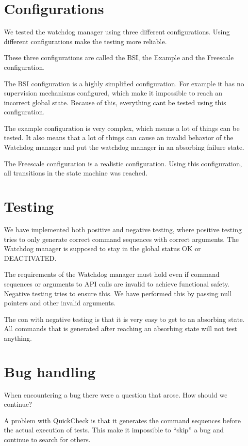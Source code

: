 \documentclass[a4paper]{article}
\begin{document}
\section{Configurations}
We tested the watchdog manager using three different
configurations. Using different configurations make the testing more
reliable.

These three configurations are called the BSI, the Example and the
Freescale configuration.

The BSI configuration is a highly simplified configuration. For
example it has no supervision mechanisms configured, which make it
impossible to reach an incorrect global state.
Because of this, everything cant be tested using this configuration.

The example configuration is very complex, which means a lot of things
can be tested. It also means that a lot of things can cause an invalid
behavior of the Watchdog manager and put the watchdog manager in an
absorbing failure state.

The Freescale configuration is a realistic configuration.
Using this configuration, all transitions in the state machine was reached.

\section{Testing}
We have implemented both positive and negative testing, where positive
testing tries to only generate correct command sequences with correct
arguments. The Watchdog manager is supposed to stay in the global
status OK or DEACTIVATED.

The requirements of the Watchdog manager must hold even if command
sequences or arguments to API calls are invalid to achieve functional
safety. Negative testing tries to ensure this. We have performed this
by passing null pointers and other invalid arguments.

The con with negative testing is that it is very easy to get to an
absorbing state. All commands that is generated after reaching an
absorbing state will not test anything.

\section{Bug handling}
When encountering a bug there were a question that arose. How should
we continue?

A problem with QuickCheck is that it generates the command sequences
before the actual execution of tests. This make it impossible to
``skip'' a bug and continue to search for others.
\end{document}
